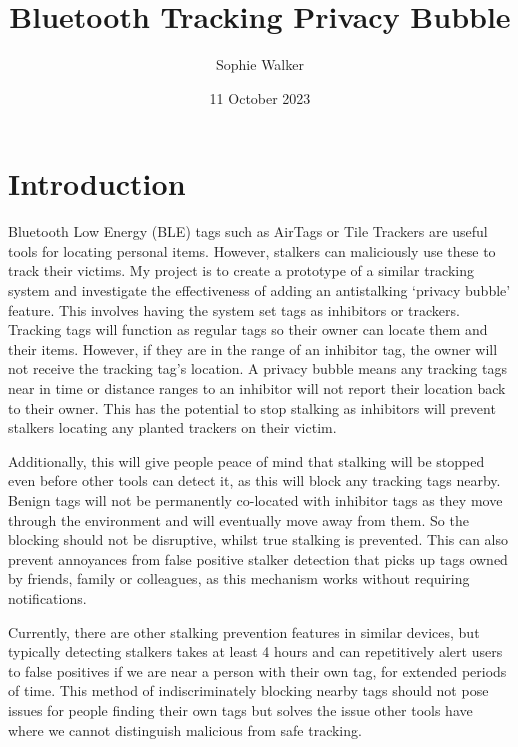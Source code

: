 \documentclass{article}
\begin{document}
\title{Bluetooth Tracking Privacy Bubble}
\author{Sophie Walker}
\date{11 October 2023}
\maketitle
\thispagestyle{empty}
\section{Introduction}




Bluetooth Low Energy (BLE) tags such as AirTags or Tile Trackers are useful tools for locating personal items. However, stalkers can  maliciously use these to track their victims.  My project is to create a prototype of a similar tracking system and investigate the effectiveness of adding an antistalking `privacy bubble' feature. This involves having the system set tags as inhibitors or trackers. Tracking tags will function as regular tags so their owner can locate them and their items. However, if they are in the range of an inhibitor tag,  the owner will not receive the tracking tag's location. A privacy bubble means any tracking tags near in time or distance ranges to an inhibitor will not report their location back to their owner. This has the potential to stop stalking as inhibitors   will prevent stalkers locating any planted trackers on their victim.
\par
Additionally, this will give people peace of mind that stalking will be stopped even before other tools can detect it, as this will block any tracking tags nearby. Benign tags will not be permanently co-located with inhibitor tags as they move through the environment and will eventually move away from them. So the blocking should not be disruptive, whilst true stalking is prevented. This can also prevent annoyances from false positive stalker detection that picks up tags owned by friends, family or colleagues, as this mechanism works without requiring notifications.
\par
Currently, there are other stalking prevention features in similar devices, but typically detecting stalkers takes at least 4 hours \cite{Failuresof ASProtocols} and can repetitively alert users to false positives if we are near a person with their own tag, for extended periods of time. This method of indiscriminately blocking nearby tags should not pose issues for people finding their own tags but solves the issue other tools have where we cannot distinguish malicious from safe tracking.
\end{document}
